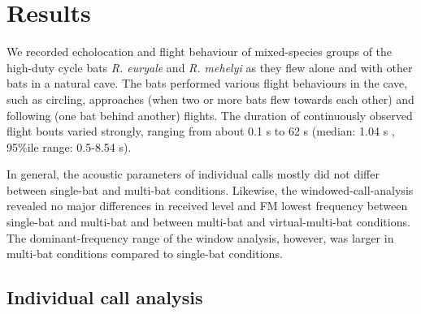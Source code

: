\documentclass[
]{book}
\begin{document}
\hypertarget{results-1}{%
\section{Results}\label{results-1}}

We recorded echolocation and flight behaviour of mixed-species groups of the high-duty cycle bats \emph{R. euryale} and \emph{R. mehelyi} as they flew alone and with other bats in a natural cave. The bats performed various flight behaviours in the cave, such as circling, approaches (when two or more bats flew towards each other) and following (one bat behind another) flights. The duration of continuously observed flight bouts varied strongly, ranging from about 0.1 s to 62 s (median: 1.04 s , 95\%ile range: 0.5-8.54 s).

In general, the acoustic parameters of individual calls mostly did not differ between single-bat and multi-bat conditions. Likewise, the windowed-call-analysis revealed no major differences in received level and FM lowest frequency between single-bat and multi-bat and between multi-bat and virtual-multi-bat conditions. The dominant-frequency range of the window analysis, however, was larger in multi-bat conditions compared to single-bat conditions.

\hypertarget{individual-call-analysis-1}{%
\subsection{Individual call analysis}\label{individual-call-analysis-1}}
\end{document}
